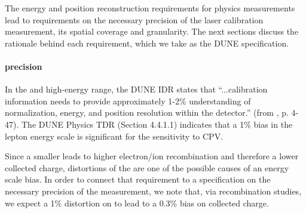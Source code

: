 




The energy and position reconstruction requirements for physics measurements lead to requirements on the necessary precision of the laser calibration \efield measurement, its spatial coverage and granularity. The next sections discuss the rationale behind each requirement, which we take as the DUNE specification.

\paragraph{\efield precision}

In the  and high-energy range, the DUNE IDR states that ``...calibration information needs to provide approximately 1-2\% understanding of normalization, energy, and position resolution within the detector.'' (from \cite{idr-vol-1}, p. 4-47). 
The DUNE Physics TDR (Section 4.4.1.1) indicates that a \num{1}\% bias in the lepton energy scale is significant for the  sensitivity to CPV.

Since a smaller \efield leads to higher electron/ion recombination and therefore a lower collected charge, distortions of the \efield are one of the possible causes of an energy scale bias. In order to connect that requirement to a specification on the necessary precision of the \efield measurement, we note that, via recombination studies\cite{mooney2018}, we expect a \num{1}\% distortion on \efield to lead to a \num{0.3}\% bias on collected charge.

